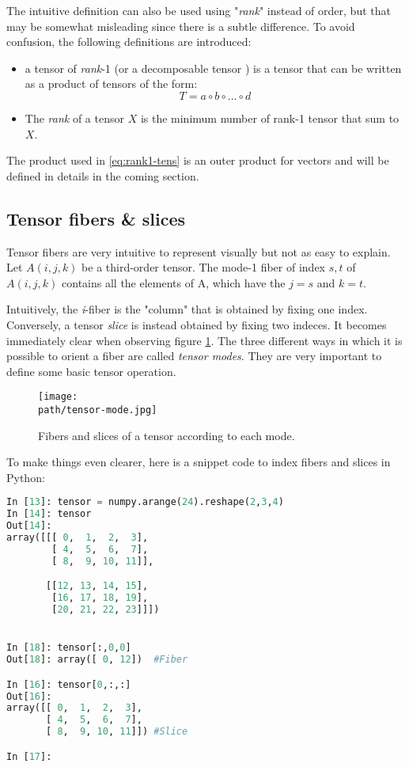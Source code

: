 The intuitive definition can also be used using "\emph{rank}" instead of order, but that may be somewhat misleading since there is a subtle difference. To avoid confusion, the following definitions are introduced: 
\begin{itemize}
  \item a tensor of \emph{rank}-1 (or a decomposable tensor \parencite{tensor-hackbusch}) is a tensor that can be written as a product of tensors of the form: 
  \begin{equation}
  \label{eq:rank1-tens}
    T = a \circ b \circ \ldots \circ d  
  \end{equation}   
  
  \item The \emph{rank} of a tensor $X$ is the minimum number of rank-1 tensor that sum to $X$.

\end{itemize}

The product used in \ref{eq:rank1-tens} is an outer product for vectors and will be defined in details in the coming section. 

\subsection{Tensor fibers \& slices}
Tensor fibers are very intuitive to represent visually but not as easy to explain. \\

Let $A(i,j,k)$ be a third-order tensor. The mode-1 fiber of index $s,t$  of $A(i,j,k)$ contains all the elements of A, which have the $j=s$ and $k=t$. 

Intuitively, the \emph{i}-fiber is the "column" that is obtained by fixing one index. Conversely, a tensor \emph{slice} is instead obtained by fixing two indeces. It becomes immediately clear when observing figure \ref{fig:tensor-fibers}. The three different ways in which it is possible to orient a fiber are called \emph{tensor modes}. They are very important to define some basic tensor operation. 

\begin{figure}[h!]
 \centering
 \texttt{[image: \\path/tensor-mode.jpg]} 
 \caption{Fibers and slices of a tensor according to each mode.}
 \label{fig:tensor-fibers}
\end{figure}

\pagebreak
To make things even clearer, here is a snippet code to index fibers and slices in Python: 
\begin{lstlisting}[language={Python}]
In [13]: tensor = numpy.arange(24).reshape(2,3,4) 
In [14]: tensor
Out[14]: 
array([[[ 0,  1,  2,  3],
        [ 4,  5,  6,  7],
        [ 8,  9, 10, 11]],

       [[12, 13, 14, 15],
        [16, 17, 18, 19],
        [20, 21, 22, 23]]])


In [18]: tensor[:,0,0]
Out[18]: array([ 0, 12])  #Fiber

In [16]: tensor[0,:,:]
Out[16]: 
array([[ 0,  1,  2,  3],
       [ 4,  5,  6,  7],
       [ 8,  9, 10, 11]]) #Slice 

In [17]: 

\end{lstlisting}


